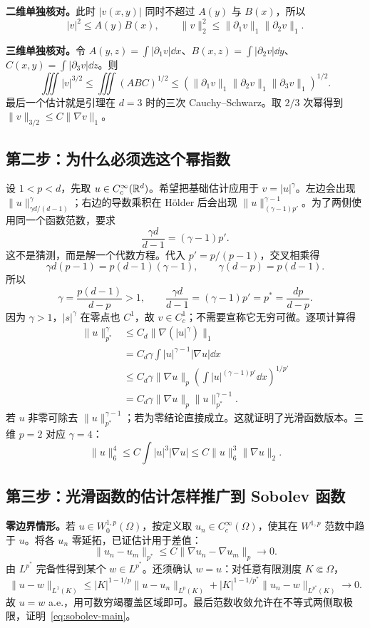 \textbf{二维单独核对。}此时 $|v(x,y)|$ 同时不超过 $A(y)$ 与 $B(x)$，所以
\[
 |v|^2\le A(y)B(x),\qquad
 \|v\|_2^2\le\|\partial_1v\|_1\|\partial_2v\|_1.
\]

\textbf{三维单独核对。}令 $A(y,z)=\int|\partial_1v|\dd x$、$B(x,z)=\int|\partial_2v|\dd y$、$C(x,y)=\int|\partial_3v|\dd z$。则
\[
 \iiint|v|^{3/2}\le\iiint(ABC)^{1/2}
 \le(\|\partial_1v\|_1\|\partial_2v\|_1\|\partial_3v\|_1)^{1/2}.
\]
最后一个估计就是引理在 $d=3$ 时的三次 Cauchy--Schwarz。取 $2/3$ 次幂得到 $\|v\|_{3/2}\le C\|\nabla v\|_1$。

\subsection{第二步：为什么必须选这个幂指数}

设 $1<p<d$，先取 $u\in C_c^\infty(\mathbb R^d)$。希望把基础估计应用于 $v=|u|^\gamma$。左边会出现 $\|u\|_{\gamma d/(d-1)}^\gamma$；右边的导数乘积在 H\"older 后会出现 $\|u\|_{(\gamma-1)p'}^{\gamma-1}$。为了两侧使用同一个函数范数，要求
\[
 \frac{\gamma d}{d-1}=(\gamma-1)p'.
\]
这不是猜测，而是解一个代数方程。代入 $p'=p/(p-1)$，交叉相乘得
\[
 \gamma d(p-1)=p(d-1)(\gamma-1),\qquad
 \gamma(d-p)=p(d-1).
\]
所以
\begin{equation}
 \gamma=\frac{p(d-1)}{d-p}>1,\qquad
 \frac{\gamma d}{d-1}=(\gamma-1)p'=p^*=\frac{dp}{d-p}.
 \label{eq:sobolev-power-choice}
\end{equation}
因为 $\gamma>1$，$|s|^\gamma$ 在零点也 $C^1$，故 $v\in C_c^1$；不需要宣称它无穷可微。逐项计算得
\begin{align*}
 \|u\|_{p^*}^{\gamma}
 &\le C_d\|\nabla(|u|^\gamma)\|_1\\
 &=C_d\gamma\int|u|^{\gamma-1}|\nabla u|\dd x\\
 &\le C_d\gamma\|\nabla u\|_p
      \left(\int|u|^{(\gamma-1)p'}\dd x\right)^{1/p'}\\
 &=C_d\gamma\|\nabla u\|_p\|u\|_{p^*}^{\gamma-1}.
\end{align*}
若 $u$ 非零可除去 $\|u\|_{p^*}^{\gamma-1}$；若为零结论直接成立。这就证明了光滑函数版本。三维 $p=2$ 对应 $\gamma=4$：
\[
 \|u\|_6^4\le C\int|u|^3|\nabla u|
 \le C\|u\|_6^3\|\nabla u\|_2.
\]

\subsection{第三步：光滑函数的估计怎样推广到 Sobolev 函数}

\textbf{零边界情形。}若 $u\in W^{1,p}_0(\Omega)$，按定义取 $u_n\in C_c^\infty(\Omega)$，使其在 $W^{1,p}$ 范数中趋于 $u$。将各 $u_n$ 零延拓，已证估计用于差值：
\[
 \|u_n-u_m\|_{p^*}\le C\|\nabla u_n-\nabla u_m\|_p\to0.
\]
由 $L^{p^*}$ 完备性得到某个 $w\in L^{p^*}$。还须确认 $w=u$：对任意有限测度 $K\Subset\Omega$，
\[
 \|u-w\|_{L^1(K)}
 \le |K|^{1-1/p}\|u-u_n\|_{L^p(K)}
     +|K|^{1-1/p^*}\|u_n-w\|_{L^{p^*}(K)}\to0.
\]
故 $u=w$ a.e.，用可数穷竭覆盖区域即可。最后范数收敛允许在不等式两侧取极限，证明~\eqref{eq:sobolev-main}。

